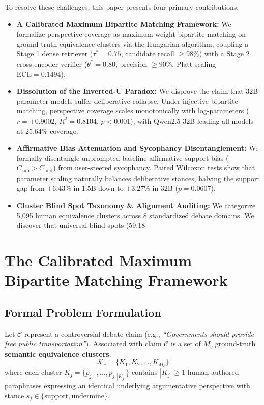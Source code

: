 \documentclass[11pt,a4paper]{article}
\begin{document}
To resolve these challenges, this paper presents four primary contributions:
\begin{itemize}
    \item \textbf{A Calibrated Maximum Bipartite Matching Framework:} We formalize perspective coverage as maximum-weight bipartite matching on ground-truth equivalence clusters via the Hungarian algorithm, coupling a Stage 1 dense retriever ($\tau^* = 0.75$, candidate recall $\ge 98\%$) with a Stage 2 cross-encoder verifier ($\theta^* = 0.80$, precision $\ge 90\%$, Platt scaling $\text{ECE} = 0.1494$).
    \item \textbf{Dissolution of the Inverted-U Paradox:} We disprove the claim that 32B parameter models suffer deliberative collapse. Under injective bipartite matching, perspective coverage scales monotonically with log-parameters ($r = +0.9002$, $R^2 = 0.8104$, $p < 0.001$), with Qwen2.5-32B leading all models at $25.64\%$ coverage.
    \item \textbf{Affirmative Bias Attenuation and Sycophancy Disentanglement:} We formally disentangle unprompted baseline affirmative support bias ($C_{\text{sup}} > C_{\text{und}}$) from user-steered sycophancy. Paired Wilcoxon tests show that parameter scaling naturally balances deliberative stances, halving the support gap from $+6.43\%$ in 1.5B down to $+3.27\%$ in 32B ($p = 0.0607$).
    \item \textbf{Cluster Blind Spot Taxonomy & Alignment Auditing:} We categorize 5,095 human equivalence clusters across 8 standardized debate domains. We discover that universal blind spots (59.18%
\end{itemize}

\section{The Calibrated Maximum Bipartite Matching Framework}

\subsection{Formal Problem Formulation}
Let $\mathcal{C}$ represent a controversial debate claim (e.g., \textit{``Governments should provide free public transportation''}). Associated with claim $\mathcal{C}$ is a set of $M_c$ ground-truth \textbf{semantic equivalence clusters}:
\begin{equation}
    \mathcal{K}_c = \{K_1, K_2, \dots, K_{M_c}\}
\end{equation}
where each cluster $K_j = \{p_{j,1}, \dots, p_{j,|K_j|}\}$ contains $|K_j| \ge 1$ human-authored paraphrases expressing an identical underlying argumentative perspective with stance $s_j \in \{\text{support}, \text{undermine}\}$.
\end{document}
